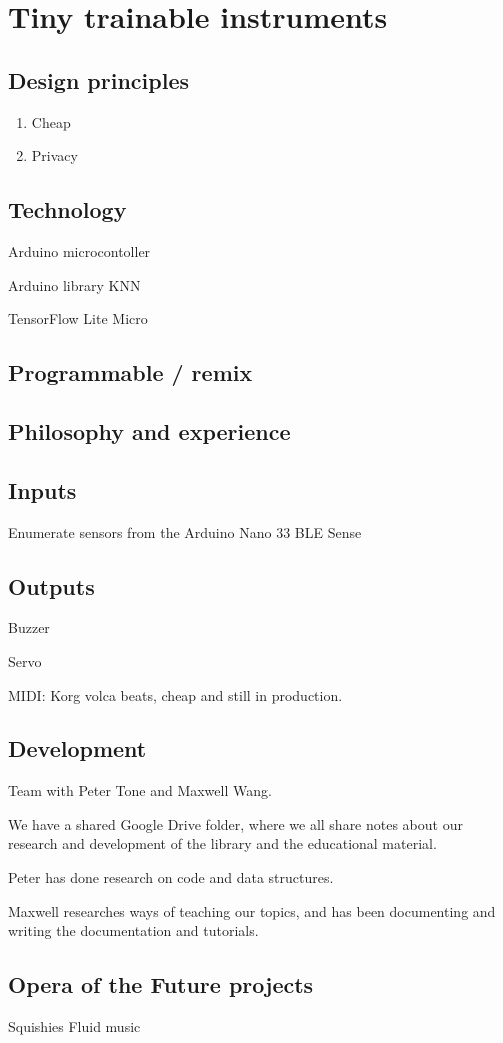 \chapter{Tiny trainable instruments}

\section{Design principles}

\begin{enumerate}
  \item Cheap
  \item Privacy
\end{enumerate}

\section{Technology}

Arduino microcontoller

Arduino library KNN

TensorFlow Lite Micro

\section{Programmable / remix}

\section{Philosophy and experience}

\section{Inputs}

Enumerate sensors from the Arduino Nano 33 BLE Sense

\section{Outputs}

Buzzer

Servo

MIDI: Korg volca beats, cheap and still in production.

\section{Development}

Team with Peter Tone and Maxwell Wang.

We have a shared Google Drive folder, where we all share notes about our research and development of the library and the educational material.

Peter has done research on code and data structures.

Maxwell researches ways of teaching our topics, and has been documenting and writing the documentation and tutorials.

\section{Opera of the Future projects}

Squishies
Fluid music